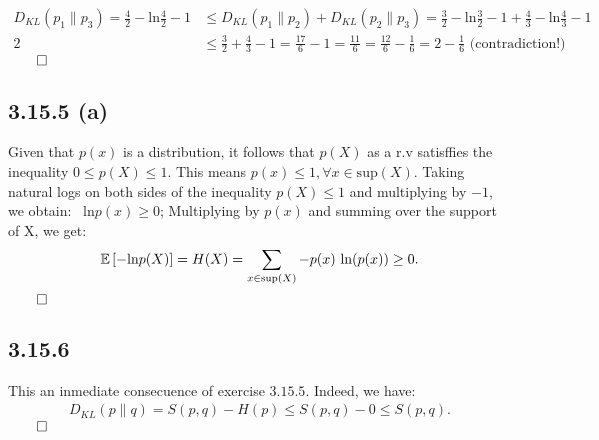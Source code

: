 \documentclass{exam}
\renewenvironment{proof}{{\noindent\itshape\ignorespaces}}{{\hfill$\qed$\\}}
\begin{document}
\begin{proof}
    \begin{equation*}
        \begin{aligned}
            D_{KL}(p_1 \lVert p_3) = \frac{4}{2} - \text{ln}\frac{4}{2} - 1  &\leq D_{KL}(p_1 \lVert p_2) + D_{KL}(p_2 \lVert p_3) = \frac{3}{2} - \text{ln}\frac{3}{2} - 1 + \frac{4}{3} - \text{ln}\frac{4}{3} - 1\\
            2 &\leq \frac{3}{2} + \frac{4}{3} -1  = \frac{17}{6} - 1 = \frac{11}{6} = \frac{12}{6} - \frac{1}{6} = 2 - \frac{1}{6} \text{ (contradiction!)}
        \end{aligned}
    \end{equation*}
\end{proof}

\subsection*{3.15.5 (a)}
Given that $p(x)$ is a distribution, it follows that $p(X)$  as a r.v satisffies the inequality $0 \leq p(X) \leq 1$. This means $p(x) \leq 1, \forall x \in \text{sup}\left( X \right)$. Taking natural logs on both sides of the inequality $p(X) \leq 1$ and multiplying by $-1$, we obtain: \ $\text{ln}p(x) \geq 0$; Multiplying by $p(x)$ and summing over the support of X, we get:\\
\begin{proof}
    \begin{equation*}
        \begin{aligned}
             \mathbb{E}\left[ - \text{ln}p(X) \right] = H(X) = \displaystyle \sum_{\tiny x \in \text{sup}\left( X \right)}-p(x) \ \text{ln}(p(x)) \geq 0 \text{.}
        \end{aligned}
    \end{equation*}
\end{proof}

\subsection*{3.15.6}
This an inmediate consecuence of exercise $3.15.5$. Indeed, we have:\\
\begin{proof}
    \begin{equation*}
        \begin{aligned}
            D_{KL}(p \lVert q) = S(p,q) - H(p) \leq S(p,q) - 0  \leq S(p,q) \text{.}
        \end{aligned}
    \end{equation*}
\end{proof}
\end{document}
